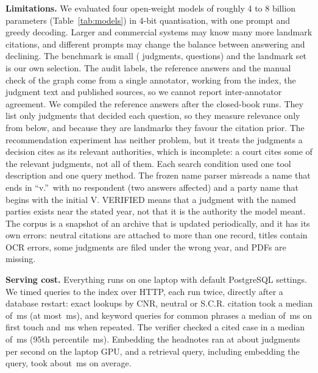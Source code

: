\textbf{Limitations.} We evaluated four open-weight models of roughly 4 to 8 billion parameters (Table~\ref{tab:models}) in 4-bit quantisation, with one prompt and greedy decoding. Larger and commercial systems may know many more landmark citations, and different prompts may change the balance between answering and declining. The benchmark is small (\NumJudgments{} judgments, \NumTopics{} questions) and the landmark set is our own selection. The audit labels, the reference answers and the manual check of the graph come from a single annotator, working from the index, the judgment text and published sources, so we cannot report inter-annotator agreement. We compiled the reference answers after the closed-book runs. They list only judgments that decided each question, so they measure relevance only from below, and because they are landmarks they favour the citation prior. The recommendation experiment has neither problem, but it treats the judgments a decision cites as its relevant authorities, which is incomplete: a court cites some of the relevant judgments, not all of them. Each search condition used one tool description and one query method. The frozen name parser misreads a name that ends in ``v.''\ with no respondent (two answers affected) and a party name that begins with the initial V. VERIFIED means that a judgment with the named parties exists near the stated year, not that it is the authority the model meant. The corpus is a snapshot of an archive that is updated periodically, and it has its own errors: \SCDupGroups{} neutral citations are attached to more than one record, titles contain OCR errors, some judgments are filed under the wrong year, and \GraphTextFail{} PDFs are missing.

\textbf{Serving cost.} Everything runs on one laptop with default PostgreSQL settings. We timed \LatQueries{} queries to the index over HTTP, each run twice, directly after a database restart: exact lookups by CNR, neutral or S.C.R. citation took a median of \LatExactMedian{}\,ms (at most \LatExactMax{}\,ms), and keyword queries for common phrases a median of \LatCommonFirstMedian{}\,ms on first touch and \LatCommonWarmMedian{}\,ms when repeated. The verifier checked a cited case in a median of \VerifyMedianMs{}\,ms (95th percentile \VerifyPNinetyFiveMs{}\,ms). Embedding the headnotes ran at about \EmbedRate{} judgments per second on the laptop GPU, and a retrieval query, including embedding the query, took about \QueryMs{}\,ms on average.
